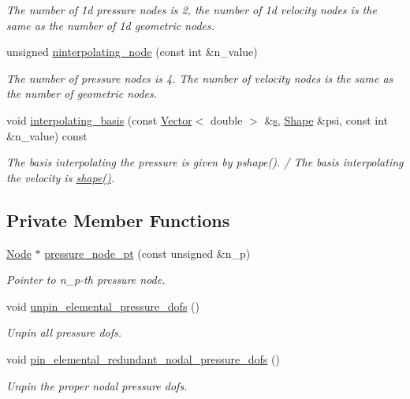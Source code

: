 \begin{DoxyCompactItemize}
\begin{DoxyCompactList}\small\item\em The number of 1d pressure nodes is 2, the number of 1d velocity nodes is the same as the number of 1d geometric nodes. \end{DoxyCompactList}\item 
unsigned \hyperlink{classoomph_1_1RefineableQSphericalTaylorHoodElement_a91dfb940844c5bf3ba6af5ed10d683f2}{ninterpolating\+\_\+node} (const int \&n\+\_\+value)
\begin{DoxyCompactList}\small\item\em The number of pressure nodes is 4. The number of velocity nodes is the same as the number of geometric nodes. \end{DoxyCompactList}\item 
void \hyperlink{classoomph_1_1RefineableQSphericalTaylorHoodElement_a3d72f67b7cb920fb9d006b440fd02922}{interpolating\+\_\+basis} (const \hyperlink{classoomph_1_1Vector}{Vector}$<$ double $>$ \&\hyperlink{cfortran_8h_ab7123126e4885ef647dd9c6e3807a21c}{s}, \hyperlink{classoomph_1_1Shape}{Shape} \&psi, const int \&n\+\_\+value) const
\begin{DoxyCompactList}\small\item\em The basis interpolating the pressure is given by pshape(). / The basis interpolating the velocity is \hyperlink{classoomph_1_1FiniteElement_a58a25b6859ddd43b7bfe64a19fee5023}{shape()}. \end{DoxyCompactList}\end{DoxyCompactItemize}
\subsection*{Private Member Functions}
\begin{DoxyCompactItemize}
\item 
\hyperlink{classoomph_1_1Node}{Node} $\ast$ \hyperlink{classoomph_1_1RefineableQSphericalTaylorHoodElement_a41a9632ac4bafa843dd8e3cf291ab390}{pressure\+\_\+node\+\_\+pt} (const unsigned \&n\+\_\+p)
\begin{DoxyCompactList}\small\item\em Pointer to n\+\_\+p-\/th pressure node. \end{DoxyCompactList}\item 
void \hyperlink{classoomph_1_1RefineableQSphericalTaylorHoodElement_af90c9272d1d4ba4983141effe918d135}{unpin\+\_\+elemental\+\_\+pressure\+\_\+dofs} ()
\begin{DoxyCompactList}\small\item\em Unpin all pressure dofs. \end{DoxyCompactList}\item 
void \hyperlink{classoomph_1_1RefineableQSphericalTaylorHoodElement_a0aa5d5880b277ae6f4711b54e4b28203}{pin\+\_\+elemental\+\_\+redundant\+\_\+nodal\+\_\+pressure\+\_\+dofs} ()
\begin{DoxyCompactList}\small\item\em Unpin the proper nodal pressure dofs. \end{DoxyCompactList}\end{DoxyCompactItemize}

